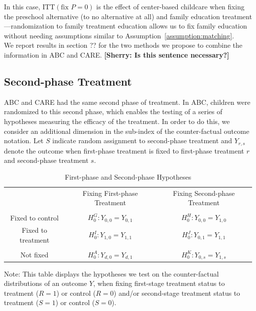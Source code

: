 \noindent In this case, $\text{ITT} \left( \text{fix } P = 0\right)$ is the effect of center-based childcare when fixing the preschool alternative (to no alternative at all) and family education treatment---randomization to family treatment education allows us to fix family education without needing assumptions similar to Assumption~\ref{assumption:matching}.\\

\noindent We report results in section ?? for the two methods we propose to combine the information in ABC and CARE. \textbf{[Sherry: Is this sentence necessary?]}

\subsection{Second-phase Treatment}

\noindent ABC and CARE had the same second phase of treatment. In ABC, children were randomized to this second phase, which enables the testing of a series of hypotheses measuring the efficacy of the treatment. 
In order to do this, we consider an additional dimension in the sub-index of the counter-factual outcome notation. Let $S$ indicate random assignment to second-phase treatment and $Y_{r,s}$ denote the outcome when first-phase treatment is fixed to first-phase treatment $r$ and second-phase treatment $s$.\\

\begin{table}[H] 
\begin{threeparttable}
\caption{First-phase and Second-phase Hypotheses}
\label{table:hypotheses}
\centering 
\begin{tabular}{ccc} \hline \hline
 & Fixing First-phase Treatment & Fixing Second-phase Treatment \\ \\ \hline
Fixed to control       & $H_{0}^G: Y_{0,0} = Y_{0,1}$ & $H_{0}^H: Y_{0,0} = Y_{1,0}$ \\
Fixed to treatment  & $H_{0}^I: Y_{1,0} = Y_{1,1}$ & $H_{0}^J: Y_{0,1} = Y_{1,1}$ \\ \\ \hline
Not fixed                 & $H_{0}^A: Y_{d,0} = Y_{d,1}$ & $H_{0}^K: Y_{0,s} = Y_{1,s}$ \\  \hline \hline
\end{tabular}
\begin{tablenotes}
\footnotesize
\item Note: This table displays the hypotheses we test on the counter-factual distributions of an outcome $Y$, when fixing first-stage treatment status to treatment ($R = 1$) or control ($R = 0$) and/or second-stage treatment status to treatment ($S = 1$) or control ($S = 0$).
\end{tablenotes}
\end{threeparttable}
\end{table}

